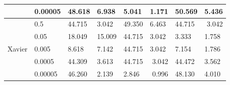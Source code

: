 \begin{table}[H]
\begin{tabular}{cl|llllll|}
\multicolumn{1}{c|}{}                                                         & 0.00005                                                                             & 48.618 & \multicolumn{1}{l|}{6.938}  & 5.041  & \multicolumn{1}{r|}{1.171}  & 50.569 & 5.436                      \\ \hline
\multicolumn{1}{c|}{\multirow{5}{*}{Xavier}}                                  & 0.5                                                                                 & 44.715 & \multicolumn{1}{l|}{3.042}  & 49.350 & \multicolumn{1}{l|}{6.463}  & 44.715 & \multicolumn{1}{r|}{3.042} \\
\multicolumn{1}{c|}{}                                                         & 0.05                                                                                & 18.049 & \multicolumn{1}{l|}{15.009} & 44.715 & \multicolumn{1}{l|}{3.042}  & 3.333  & 1.758                      \\
\multicolumn{1}{c|}{}                                                         & 0.005                                                                               & 8.618  & \multicolumn{1}{l|}{7.142}  & 44.715 & \multicolumn{1}{l|}{3.042}  & 7.154  & 1.786                      \\
\multicolumn{1}{c|}{}                                                         & 0.0005                                                                              & 44.309 & \multicolumn{1}{l|}{3.613}  & 44.715 & \multicolumn{1}{r|}{3.042}  & 44.472 & 3.562                      \\
\multicolumn{1}{c|}{}                                                         & 0.00005                                                                             & 46.260 & \multicolumn{1}{l|}{2.139}  & 2.846  & \multicolumn{1}{r|}{0.996}  & 48.130 & 4.010                     
\end{tabular}
\end{table}